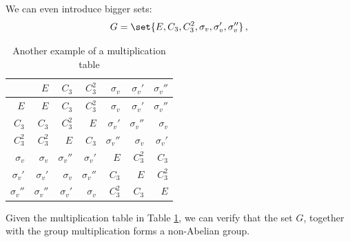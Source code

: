             We can even introduce bigger sets:
            \begin{equation}
                G = \set{E, C_3, C^2_3, \sigma_v, \sigma_v', \sigma_v''} \thinspace ,
            \end{equation}
            \begin{table}[H] \centering
                \begin{tabular}{r|rrrrrr}
                                & $E$           & $C_3$         & $C^2_3$       & $\sigma_v$    & $\sigma_v'$   & $\sigma_v''$  \\ \hline

                    $E$         & $E$           & $C_3$         & $C^2_3$       & $\sigma_v$    & $\sigma_v'$   & $\sigma_v''$  \\
                    $C_3$       & $C_3$         & $C^2_3$       & $E$           & $\sigma_v'$   & $\sigma_v''$  & $\sigma_v$    \\
                    $C^2_3$     & $C^2_3$       & $E$           & $C_3$         & $\sigma_v''$  & $\sigma_v$    & $\sigma_v'$   \\
                    $\sigma_v$  & $\sigma_v$    & $\sigma_v''$  & $\sigma_v'$   & $E$           & $C^2_3$       & $C_3$         \\
                    $\sigma_v'$ & $\sigma_v'$   & $\sigma_v$    & $\sigma_v''$  & $C_3$         & $E$           & $C^2_3$       \\
                    $\sigma_v''$& $\sigma_v''$  & $\sigma_v'$   & $\sigma_v$    & $C^2_3$       & $C_3$         & $E$
                \end{tabular}
                \caption{Another example of a multiplication table}
                \label{table:multiplication_table_C3v}
            \end{table}
            Given the multiplication table in Table \ref{table:multiplication_table_C3v}, we can verify that the set $G$, together with the group multiplication forms a non-Abelian group. \\

